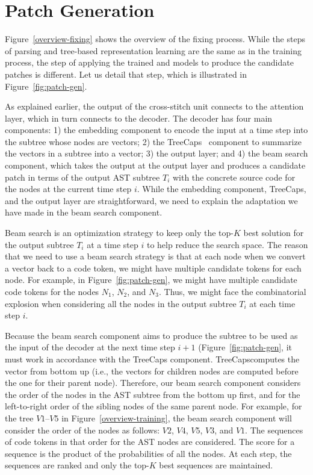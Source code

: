 \section{Patch Generation}
\label{sec:patch-gen}

Figure~\ref{overview-fixing} shows the overview of the fixing process.
While the steps of parsing and tree-based representation learning are
the same as in the training process, the step of applying the trained
 and  models to produce the candidate patches is
different. Let us detail that step, which is illustrated in
Figure~\ref{fig:patch-gen}.

As explained earlier, the output of the cross-stitch unit connects to
the attention layer, which in turn connects to the decoder. The
decoder has four main components: 1) the embedding component to encode
the input at a time step into the subtree whose nodes are vectors; 2)
the TreeCaps~\cite{bui2021treecaps} component to summarize the vectors
in a subtree into a vector; 3) the output layer; and 4) the beam
search component, which takes the output at the output layer and
produces a candidate patch in terms of the output AST subtree $T_i$
with the concrete source code for the nodes at the current time step
$i$.  While the embedding component, TreeCaps, and the output layer
are straightforward, we need to explain the adaptation we have made in
the beam search component.

Beam search is an optimization strategy to keep only the top-$K$ best
solution for the output subtree $T_i$ at a time step $i$ to help
reduce the search space. The reason that we need to use a beam search
strategy is that at each node when we convert a vector back to a code
token, we might have multiple candidate tokens for each node. For
example, in Figure~\ref{fig:patch-gen}, we might have multiple
candidate code tokens for the nodes $N_1$, $N_2$, and $N_3$. Thus, we
might face the combinatorial explosion when considering all the nodes
in the output subtree $T_i$ at each time step $i$.

Because the beam search component aims to produce the subtree to be
used as the input of the decoder at the next time step $i+1$
(Figure~\ref{fig:patch-gen}, it must work in accordance with the
TreeCaps component. TreeCapscomputes the vector from bottom up (i.e.,
the vectors for children nodes are computed before the one for their
parent node). Therefore, our beam search component considers the order
of the nodes in the AST subtree from the bottom up first, and for the
left-to-right order of the sibling nodes of the same parent node. For
example, for the tree $V1$--$V5$ in Figure~\ref{overview-training},
the beam search component will consider the order of the nodes as
follows: $V2$, $V4$, $V5$, $V3$, and $V1$. The sequences of code
tokens in that order for the AST nodes are considered. The score for a
sequence is the product of the probabilities of all the nodes. At each
step, the sequences are ranked and only the top-$K$ best sequences are
maintained.

